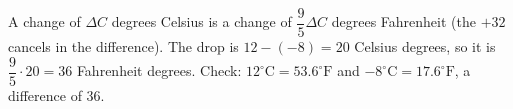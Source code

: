 A change of $\Delta C$ degrees Celsius is a change of $\dfrac{9}{5}\Delta C$ degrees Fahrenheit (the $+32$ cancels in the difference). The drop is $12-(-8)=20$ Celsius degrees, so it is $\dfrac{9}{5}\cdot20=\boxed{36}$ Fahrenheit degrees. Check: $12^\circ\mathrm{C}=53.6^\circ\mathrm{F}$ and $-8^\circ\mathrm{C}=17.6^\circ\mathrm{F}$, a difference of $36$.
